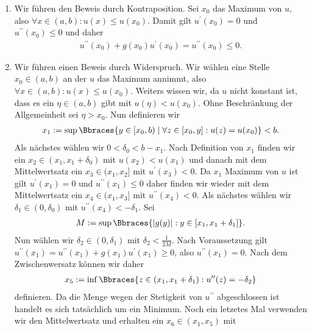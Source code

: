 \begin{solution}
	\phantom{} 
	\begin{enumerate}[label = (\roman*)]
		\item Wir führen den Beweis durch Kontraposition. Sei $x_0$ das Maximum von $u$, also $\forall x \in (a, b): u(x) \leq u(x_0)$. Damit gilt $u^\prime(x_0) = 0$ und $u^{\prime\prime}(x_0) \leq 0$ und daher
		\begin{align*}
		u^{\prime\prime}(x_0) + g(x_0) u^\prime(x_0) = u^{\prime\prime}(x_0) \leq 0.
		\end{align*}
		\item Wir führen einen Beweis durch Widerspruch. Wir wählen eine Stelle $x_0 \in (a,b)$ an der $u$ das Maximum annimmt, also $\forall x \in (a,b): u(x) \leq u(x_0)$. Weiters wissen wir, da $u$ nicht konstant ist, dass es ein $\eta \in (a,b)$ gibt mit $u(\eta) < u(x_0)$. Ohne Beschränkung der Allgemeinheit sei $\eta > x_0$. Nun definieren wir
		\begin{align*}
		x_1 := \sup\Bbraces{y \in [x_0, b) \mid \forall z \in [x_0, y]: u(z) = u(x_0)} < b.
		\end{align*}
		Als nächstes wählen wir $0 < \delta_0 < b - x_1$. Nach Definition von $x_1$ finden wir ein $x_2 \in (x_1,x_1 + \delta_0)$ mit $u(x_2) < u(x_1)$ und danach mit dem Mittelwertsatz ein $x_3 \in (x_1, x_2]$ mit $u^\prime(x_3) < 0$. Da $x_1$ Maximum von $u$ ist gilt $u^\prime(x_1) = 0$ und $u^{\prime\prime}(x_1) \leq 0$ daher finden wir wieder mit dem Mittelwertsatz ein $x_4 \in (x_1, x_3]$ mit $u^{\prime\prime}(x_4) < 0$. Als nächstes wählen wir $\delta_1 \in (0, \delta_0)$ mit $u^{\prime\prime}(x_4) < - \delta_1$.  Sei 
		\begin{align*}
		M := \sup\Bbraces{|g(y)|: y \in [x_1,x_1 + \delta_1]}.
		\end{align*} 
		Nun wählen wir $\delta_2 \in (0, \delta_1)$ mit $\delta_2 < \frac{1}{2M}$. Nach Voraussetzung gilt $u^{\prime\prime}(x_1) = u^{\prime\prime}(x_1) + g(x_1) u^\prime(x_1) \geq 0$, also $u^{\prime\prime}(x_1) = 0$. Nach dem Zwischenwersatz können wir daher
		\begin{align*}
		x_5 := \inf\Bbraces{z \in (x_1, x_1 + \delta_1): u^{\prime\prime}(z) = -\delta_2}
		\end{align*}
		definieren. Da die Menge wegen der Stetigkeit von $u^{\prime\prime}$ abgeschlossen ist handelt es sich tatsächlich um ein Minimum. Noch ein letzetes Mal verwenden wir den Mittelwertsatz und erhalten ein $x_6 \in (x_1, x_5)$ mit 
		\begin{align*}

\end{align*}
\end{enumerate}
\end{solution}
